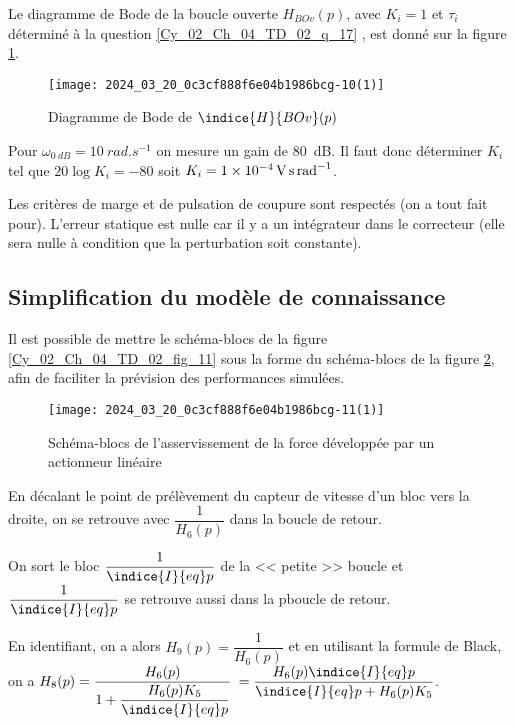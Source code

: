 \ifprof
\else
Le diagramme de Bode de la boucle ouverte $H_{B O v}(p)$, avec $K_{i}=1$ et $\tau_{i}$ déterminé à la question \ref{Cy_02_Ch_04_TD_02_q_17} , est donné sur la figure \ref{Cy_02_Ch_04_TD_02_fig_13}.



\begin{figure}[!h]
\texttt{[image: 2024\_03\_20\_0c3cf888f6e04b1986bcg-10(1)]}
\caption{Diagramme de Bode de $\indice{H}{BOv}(p)$ \label{Cy_02_Ch_04_TD_02_fig_13}}
\end{figure}
\fi


\ifprof
\begin{corrige}
Pour $\omega_{\SI{0}{dB}}=\SI{10}{rad.s^{-1}}$ on mesure un gain de \SI{80}{dB}. 
Il faut donc déterminer $K_i$ tel que $20\log K_i = -80$ soit $K_i = \SI{1e{-4}}{V.s.rad^{-1}} $. 


Les critères de marge et de pulsation de coupure sont respectés (on a tout fait pour).
L'erreur statique est nulle car il y a un intégrateur dans le correcteur (elle sera nulle à condition que la perturbation soit constante).

\end{corrige}
\else
\fi

\subsection*{Simplification du modèle de connaissance}
\ifprof
\else
Il est possible de mettre le schéma-blocs de la figure \ref{Cy_02_Ch_04_TD_02_fig_11} 
sous la forme du schéma-blocs de la figure \ref{Cy_02_Ch_04_TD_02_fig_14}, afin de faciliter la prévision des performances simulées.

\begin{figure}[!h]
\texttt{[image: 2024\_03\_20\_0c3cf888f6e04b1986bcg-11(1)]}
\caption{Schéma-blocs de l'asservissement de la force développée par un actionneur linéaire \label{Cy_02_Ch_04_TD_02_fig_14}}
\end{figure}
\fi

\ifprof
\begin{corrige}
En décalant le point de prélèvement du capteur de vitesse d'un bloc vers la droite, on se retrouve avec $\dfrac{1}{H_6(p)}$ dans la boucle de retour. 

On sort le bloc $\dfrac{1}{\indice{I}{eq}p}$ de la << petite >> boucle et $\dfrac{1}{\indice{I}{eq}p}$ se retrouve aussi dans la pboucle de retour. 

En identifiant, on a alors $H_9(p)=\dfrac{1}{H_6(p)}$ et en utilisant la formule de Black, on a 
$H_8(p)=\dfrac{H_6(p)}{1+ \dfrac{H_6(p) K_5}{\indice{I}{eq}p} }$ $=\dfrac{H_6(p) \indice{I}{eq}p}{\indice{I}{eq}p+H_6(p) K_5 }$.

\end{corrige}
\else
\fi

